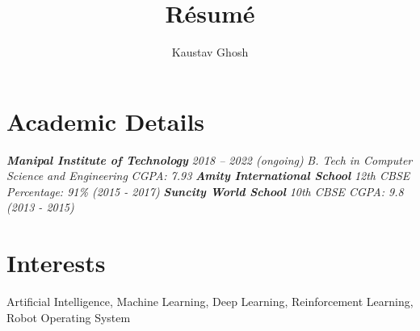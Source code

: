 \documentclass[a4paper,12pt]{article}
\begin{document}
\title{R\'esum\'e}
\author{Kaustav Ghosh}
\maketitle
\section*{Academic Details}
\textbf{\emph{Manipal Institute of Technology}}
\newline
\textit{2018 – 2022 (ongoing)}
\newline
\textit{B. Tech in Computer Science and Engineering}
\newline
\textit{CGPA: 7.93}
\newline
\textbf{\emph{Amity International School}}
\newline
\textit{12th CBSE Percentage: 91\% (2015 - 2017)}
\newline
\textbf{\emph{Suncity World School}}
\newline
\textit{10th CBSE CGPA: 9.8 (2013 - 2015)}
\section*{Interests}
Artificial Intelligence,
Machine Learning,
Deep Learning,
Reinforcement Learning,
Robot Operating System
\end{document}

